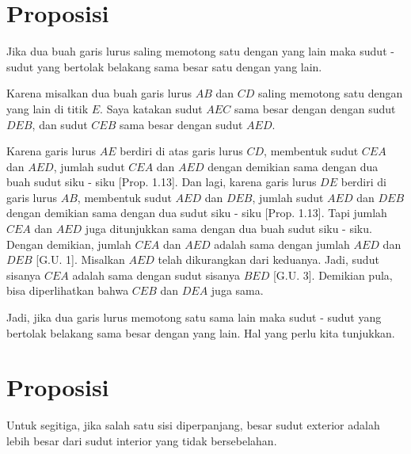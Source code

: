\documentclass[a4paper]{book}
\begin{document}
\section*{\centering Proposisi \thesection} 
Jika dua buah garis lurus saling memotong satu dengan yang lain maka sudut - 
sudut yang bertolak belakang  sama besar satu dengan yang lain.
\begin{center}
\end{center}
Karena misalkan dua buah garis lurus $AB$ dan $CD$ saling memotong satu dengan
yang lain di titik $E$. Saya katakan sudut $AEC$ sama besar dengan dengan 
sudut $DEB$, dan sudut $CEB$ sama besar dengan sudut $AED$.

Karena garis lurus $AE$ berdiri di atas garis lurus $CD$, membentuk sudut
$CEA$ dan $AED$, jumlah sudut $CEA$ dan $AED$ dengan demikian sama dengan
dua buah sudut siku - siku [Prop. 1.13]. Dan lagi, karena garis lurus $DE$ 
berdiri di garis lurus $AB$, membentuk sudut $AED$ dan $DEB$, jumlah sudut 
$AED$ dan $DEB$ dengan demikian sama dengan dua sudut siku - siku
[Prop. 1.13]. Tapi jumlah $CEA$ dan $AED$ juga ditunjukkan sama dengan dua 
buah sudut siku - siku. Dengan demikian, jumlah $CEA$ dan $AED$ adalah sama dengan
jumlah $AED$ dan $DEB$ [G.U. 1]. Misalkan $AED$ telah dikurangkan dari keduanya. 
Jadi, sudut sisanya $CEA$ adalah sama dengan sudut sisanya $BED$ [G.U. 3]. 
Demikian pula, bisa diperlihatkan bahwa $CEB$ dan $DEA$ juga sama.

Jadi, jika dua garis lurus memotong satu sama lain maka sudut - sudut yang 
bertolak belakang sama besar dengan yang lain. Hal yang perlu kita tunjukkan.

\section*{\centering Proposisi \thesection} 
Untuk segitiga, jika salah satu sisi diperpanjang, besar sudut 
exterior adalah lebih besar dari sudut interior yang tidak bersebelahan.
\end{document}
